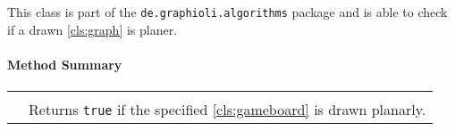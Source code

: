 This class is part of the \texttt{de.graphioli.algorithms} package and is able to check if a drawn \ref{cls:graph} is planer. \\

\centerdash

\paragraph*{Method Summary}
\paragraph*{}
\begin{longtable}{Lp{10cm}}
	\startmethodtable
	 \\
	& Returns \texttt{true} if the specified \ref{cls:gameboard} is drawn planarly. \\
	\hline
\end{longtable}